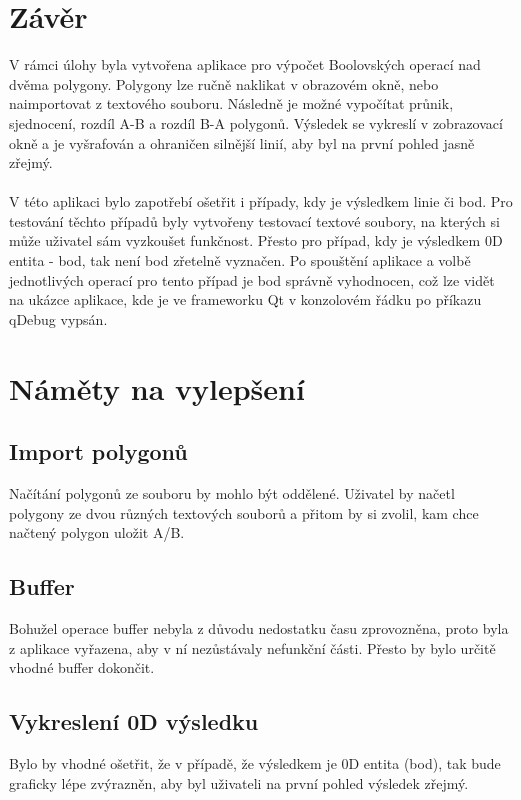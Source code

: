 \documentclass[a4paper, 12pt]{article}
\begin{document}
\clearpage
\section{Závěr}
V rámci úlohy byla vytvořena aplikace pro výpočet Boolovských operací nad dvěma polygony. Polygony lze ručně naklikat v obrazovém okně, nebo naimportovat z textového souboru. Následně je možné vypočítat průnik, sjednocení, rozdíl A-B a rozdíl B-A polygonů. Výsledek se vykreslí v zobrazovací okně a je vyšrafován a ohraničen silnější linií, aby byl na první pohled jasně zřejmý.\\
\\
V této aplikaci bylo zapotřebí ošetřit i případy, kdy je výsledkem linie či bod. Pro testování těchto případů byly vytvořeny testovací textové soubory, na kterých si může uživatel sám vyzkoušet funkčnost. Přesto pro případ, kdy je výsledkem 0D entita - bod, tak není bod zřetelně vyznačen. Po spouštění aplikace a volbě jednotlivých operací pro tento případ je bod správně vyhodnocen, což lze vidět na ukázce aplikace, kde je ve frameworku Qt v konzolovém řádku po příkazu qDebug vypsán. \\


\section{Náměty na vylepšení}
\subsection{Import polygonů}
Načítání polygonů ze souboru by mohlo být oddělené. Uživatel by načetl polygony ze dvou různých textových souborů a přitom by si zvolil, kam chce načtený polygon uložit A/B.

\subsection{Buffer}
Bohužel operace buffer nebyla z důvodu nedostatku času zprovozněna, proto byla z aplikace vyřazena, aby v ní nezůstávaly nefunkční části. Přesto by bylo určitě vhodné buffer dokončit. 

\subsection{Vykreslení 0D výsledku}
Bylo by vhodné ošetřit, že v případě, že výsledkem je 0D entita (bod), tak bude graficky lépe zvýrazněn, aby byl uživateli na první pohled výsledek zřejmý.
\end{document}
